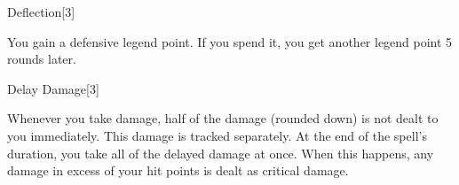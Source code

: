 \begin{spellsection}{Deflection}[3]
    \begin{spellheader}
    \end{spellheader}
    \begin{spellcontent}
        \begin{spelltargetinginfo}
        \end{spelltargetinginfo}
        \begin{spelleffects}
            \spelleffect You gain a defensive legend point. If you spend it, you get another legend point 5 rounds later.
            \spelldur \durlong
        \end{spelleffects}
    \end{spellcontent}
    \begin{spellfooter}
        \miscastexplode
    \end{spellfooter}
\end{spellsection}

\begin{spellsection}{Delay Damage}[3]
    \begin{spellheader}
    \end{spellheader}
    \begin{spellcontent}
        \begin{spelltargetinginfo}
        \end{spelltargetinginfo}
        \begin{spelleffects}
            \spelleffect Whenever you take damage, half of the damage (rounded down) is not dealt to you immediately. This damage is tracked separately. At the end of the spell's duration, you take all of the delayed damage at once. When this happens, any damage in excess of your hit points is dealt as critical damage.
            \spelldur \durmed
        \end{spelleffects}
        \begin{spellfooter}
            \miscastexplode
        \end{spellfooter}
    \end{spellcontent}
\end{spellsection}

